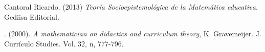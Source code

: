 \begin{titlepage}
\begin{thebibliography}{99}
 {\sc Cantoral Ricardo.} (2013) {\it Teor\'ia Socioepistemol\'ogica de la Matem\'atica educativa}. Gediisa Editorial.

. (2000). {\it A mathematician on didactics and curriculum theory}, K. Gravemeijer. J. Curr\'iculo Studies. Vol. 32, n, 777-796.

\end{thebibliography}
\end{titlepage}

\author{%
\vspace{2pt}\\
Jos\'e Manuel G\'omez Soto,\vspace{2pt} \\
 Universidad Aut\'onoma de Zacatecas, M\'exico,\vspace{2pt} \\
    \hspace*{-2cm}\texttt{\scriptsize jmgomezuam@gmail.com }\vspace{10pt} \\
         }
\pagecolor{white}
\pagestyle{eimat}
